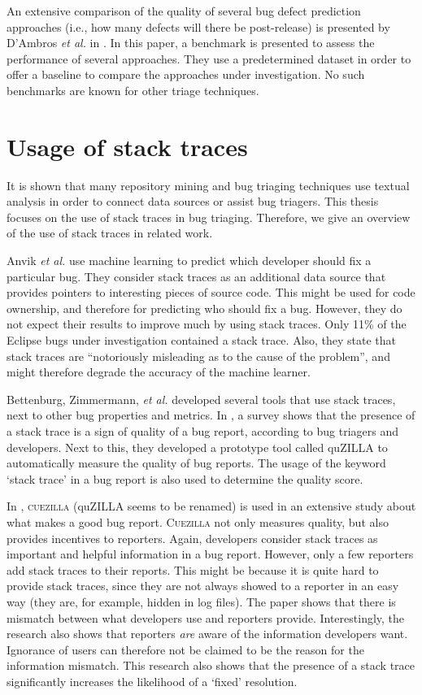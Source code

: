 An extensive comparison of the quality of several bug defect prediction approaches (i.e., how many defects will there be post-release) is presented by D'Ambros \emph{et al.} in \cite{D'Ambros2010}. In this paper, a benchmark is presented to assess the performance of several approaches. They use a predetermined dataset in order to offer a baseline to compare the approaches under investigation. No such benchmarks are known for other triage techniques.

\section{Usage of stack traces}
\label{sec:usage_of_stack_traces}
It is shown that many repository mining and bug triaging techniques use textual analysis in order to connect data sources or assist bug triagers. This thesis focuses on the use of stack traces in bug triaging. Therefore, we give an overview of the use of stack traces in related work.

Anvik \emph{et al.} \cite{Anvik2006} use machine learning to predict which developer should fix a particular bug. They consider stack traces as an additional data source that provides pointers to interesting pieces of source code. This might be used for code ownership, and therefore for predicting who should fix a bug. However, they do not expect their results to improve much by using stack traces. Only 11\% of the Eclipse bugs under investigation contained a stack trace. Also, they state that stack traces are ``notoriously misleading as to the cause of the problem'', and might therefore degrade the accuracy of the machine learner.

Bettenburg, Zimmermann, \emph{et al.} developed several tools that use stack traces, next to other bug properties and metrics. In \cite{Bettenburg2007}, a survey shows that the presence of a stack trace is a sign of quality of a bug report, according to bug triagers and developers. Next to this, they developed a prototype tool called quZILLA to automatically measure the quality of bug reports. The usage of the keyword `stack trace' in a bug report is also used to determine the quality score. 

In \cite{Zimmermann2010}, \textsc{cuezilla} (quZILLA seems to be renamed) is used in an extensive study about what makes a good bug report. \textsc{Cuezilla} not only measures quality, but also provides incentives to reporters. Again, developers consider stack traces as important and helpful information in a bug report. However, only a few reporters add stack traces to their reports. This might be because it is quite hard to provide stack traces, since they are not always showed to a reporter in an easy way (they are, for example, hidden in log files). The paper shows that there is mismatch between what developers use and reporters provide. Interestingly, the research also shows that reporters \emph{are} aware of the information developers want. Ignorance of users can therefore not be claimed to be the reason for the information mismatch. This research also shows that the presence of a stack trace significantly increases the likelihood of a `fixed' resolution.

